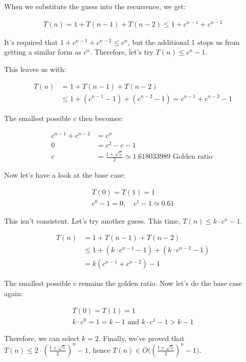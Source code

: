 \documentclass[11pt,a4paper,titlepage,dvipsnames,cmyk]{scrartcl}
\begin{document}
When we substitute the guess into the recurrence, we get:

\begin{align*}
    T(n) = 1 + T(n-1) + T(n-2) \le 1 + c^{n-1} + c^{n-2}
\end{align*}

It's required that $1 + c^{n-1} + c^{n-2} \le c^n$, but the additional 1
stops us from getting a similar form as $c^n$. Therefore, let's try $T(n)
\le c^n -1$.

This leaves us with:

\begin{align*}
    T(n) &= 1 + T(n-1) + T(n-2) \\
    &\le 1 + (c^{n-1} - 1) + (c^{n-2} - 1) = c^{n-1} + c^{n-2} - 1
\end{align*}

The smallest possible $c$ then becomes:

\begin{align*}
    c^{n-1} + c^{n-2} &= c^n \\
    0 &= c^2 - c - 1 \\
    c &= \frac{1+\sqrt 5}{2} \simeq 1.618033989 \text{ Golden ratio }
\end{align*}

Now let's have a look at the base case:

\begin{align*}
    T(0) = T(1) = 1 \\
    c^0 - 1 = 0, \quad c^1 -1 \simeq 0.61
\end{align*}

This isn't consistent. Let's try another guess. This time, $T(n) \le k
\cdot c^n - 1$. 

\begin{align*}
    T(n) &= 1 + T(n - 1) + T(n - 2) \\
    &\le 1 + (k\cdot c^{n-1} - 1) + (k \cdot c^{n-2} - 1) \\
    &= k(c^{n-1} + c^{n-2}) - 1
\end{align*}

The smallest possible $c$ remains the golden ratio. Now let's do the base
case again:

\begin{align*}
    T(0) = T(1) = 1 \\
    k \cdot c^0 = 1 = k - 1 \text{ and } k \cdot c^1 - 1 > k - 1
\end{align*}

Therefore, we can select $k=2$. Finally, we've proved that $T(n) \le
2\cdot (\frac{1+\sqrt5}{2})^n-1$, hence $T(n) \in O \big (
(\frac{1+\sqrt5}{2})^n-1 \big )$.
\end{document}
